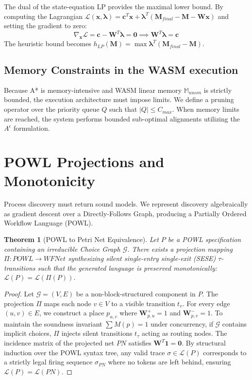 \documentclass[11pt,a4paper,twocolumn]{article}
\newtheorem{theorem}{Theorem}
\begin{document}
The dual of the state-equation LP provides the maximal lower bound. By computing the Lagrangian $\mathcal{L}(\mathbf{x}, \bm{\lambda}) = \mathbf{c}^T \mathbf{x} + \bm{\lambda}^T (\mathbf{M}_{final} - \mathbf{M} - \mathbf{W} \mathbf{x})$ and setting the gradient to zero:
\[ \nabla_{\mathbf{x}} \mathcal{L} = \mathbf{c} - \mathbf{W}^T \bm{\lambda} = \mathbf{0} \implies \mathbf{W}^T \bm{\lambda} = \mathbf{c} \]
The heuristic bound becomes $h_{LP}(\mathbf{M}) = \max \bm{\lambda}^T (\mathbf{M}_{final} - \mathbf{M})$.

\subsection{Memory Constraints in the WASM execution}
Because A* is memory-intensive and WASM linear memory $\mathbb{M}_{wasm}$ is strictly bounded, the execution architecture must impose limits. We define a pruning operator over the priority queue $Q$ such that $|Q| \le C_{max}$. When memory limits are reached, the system performs bounded sub-optimal alignments utilizing the $A^\epsilon$ formulation.

\section{POWL Projections and Monotonicity}
Process discovery must return sound models. We represent discovery algebraically as gradient descent over a Directly-Follows Graph, producing a Partially Ordered Workflow Language (POWL). 

\begin{theorem}[POWL to Petri Net Equivalence]
Let $P$ be a POWL specification containing an irreducible Choice Graph $\mathcal{G}$. There exists a projection mapping $\Pi: POWL \to WFNet$ synthesizing silent single-entry single-exit (SESE) $\tau$-transitions such that the generated language is preserved monotonically: $\mathcal{L}(P) = \mathcal{L}(\Pi(P))$.
\end{theorem}
\begin{proof}
Let $\mathcal{G} = (V, E)$ be a non-block-structured component in $P$. The projection $\Pi$ maps each node $v \in V$ to a visible transition $t_v$. For every edge $(u, v) \in E$, we construct a place $p_{u,v}$ where $\mathbf{W}^+_{p, u} = 1$ and $\mathbf{W}^-_{p, v} = 1$.
To maintain the soundness invariant $\sum M(p) = 1$ under concurrency, if $\mathcal{G}$ contains implicit choices, $\Pi$ injects silent transitions $t_\tau$ acting as routing nodes. The incidence matrix of the projected net $PN$ satisfies $\mathbf{W}^T \mathbf{1} = \mathbf{0}$. By structural induction over the POWL syntax tree, any valid trace $\sigma \in \mathcal{L}(P)$ corresponds to a strictly legal firing sequence $\sigma_{PN}$ where no tokens are left behind, ensuring $\mathcal{L}(P) = \mathcal{L}(PN)$.
\end{proof}
\end{document}
